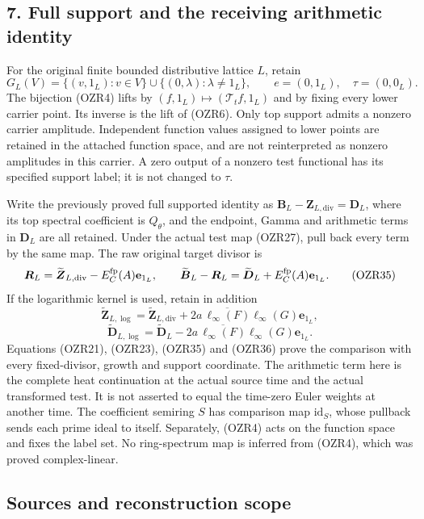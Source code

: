 \documentclass[
  10pt,
  a4paper,
]{article}
\begin{document}
\subsection{7. Full support and the receiving arithmetic
identity}\label{full-support-and-the-receiving-arithmetic-identity}

For the original finite bounded distributive lattice \(L\), retain \[
G_L(V)=\{(v,1_L):v\in V\}\cup
 \{(0,\lambda):\lambda\ne1_L\},\qquad
e=(0,1_L),\quad\tau=(0,0_L).
\tag{OZR34}
\] The bijection (OZR4) lifts by \((f,1_L)\mapsto(\mathcal T_tf,1_L)\)
and by fixing every lower carrier point. Its inverse is the lift of
(OZR6). Only top support admits a nonzero carrier amplitude. Independent
function values assigned to lower points are retained in the attached
function space, and are not reinterpreted as nonzero amplitudes in this
carrier. A zero output of a nonzero test functional has its specified
support label; it is not changed to \(\tau\).

Write the previously proved full supported identity as
\(\boldsymbol B_L-\boldsymbol Z_{L,\mathrm{div}}=\boldsymbol D_L\),
where its top spectral coefficient is \(Q_\theta\), and the endpoint,
Gamma and arithmetic terms in \(\boldsymbol D_L\) are all retained.
Under the actual test map (OZR27), pull back every term by the same map.
The raw original target divisor is \[
\boldsymbol R_L=\widetilde{\boldsymbol Z}_{L,\mathrm{div}}
 -E_C^{\rm fp}(A)\mathbf e_{1_L},\qquad
\widetilde{\boldsymbol B}_L-\boldsymbol R_L
=\widetilde{\boldsymbol D}_L+E_C^{\rm fp}(A)\mathbf e_{1_L}.
\tag{OZR35}
\] If the logarithmic kernel is used, retain in addition \[
\widetilde{\boldsymbol Z}_{L,\log}
=\widetilde{\boldsymbol Z}_{L,\mathrm{div}}
 +2a\,\overline{\ell_\infty(F)}\ell_\infty(G)\mathbf e_{1_L},
\] \[
\widetilde{\boldsymbol D}_{L,\log}
=\widetilde{\boldsymbol D}_L
 -2a\,\overline{\ell_\infty(F)}\ell_\infty(G)\mathbf e_{1_L}.
\tag{OZR36}
\] Equations (OZR21), (OZR23), (OZR35) and (OZR36) prove the comparison
with every fixed-divisor, growth and support coordinate. The arithmetic
term here is the complete heat continuation at the actual source time
and the actual transformed test. It is not asserted to equal the
time-zero Euler weights at another time. The coefficient semiring \(S\)
has comparison map \(\mathrm{id}_S\), whose pullback sends each prime
ideal to itself. Separately, (OZR4) acts on the function space and fixes
the label set. No ring-spectrum map is inferred from (OZR4), which was
proved complex-linear.

\subsection{Sources and reconstruction
scope}\label{sources-and-reconstruction-scope}
\end{document}
